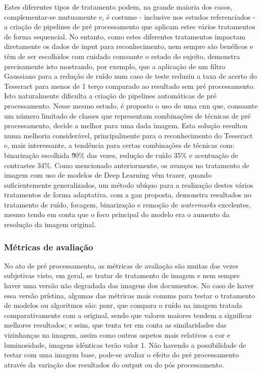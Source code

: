 Estes diferentes tipos de tratamento podem, na grande maioria dos casos, complementar-se mutuamente e, é costume - inclusive nos estudos referenciados - a criação de pipelines de pré processamento que aplicam estes vários tratamentos de forma sequencial. No entanto, como estes diferentes tratamentos impactam diretamente os dados de input para reconhecimento, nem sempre são benéficos e têm de ser escolhidos com cuidado consoante o estado do sujeito.  \cite{8269967} demonstra precisamente isto mostrando, por exemplo, que a aplicação de um filtro Gaussiano para a redução de ruído num caso de teste reduziu a taxa de acerto do Tesseract para menos de 1 terço comparado ao resultado sem pré processamento. 
Isto naturalmente dificulta a criação de pipelines automáticas de pré processamento. Nesse mesmo estudo, é proposto o uso de uma \acrshort{cnn} que, consoante um número limitado de classes que representam combinações de técnicas de pré processamento, decide a melhor para uma dada imagem. Esta solução resultou numa melhoria considerável, principalmente para o reconhecimento do Tesseract e, mais interessante, a tendência para certas combinações de técnicas com: binarização escolhida \~90\% das vezes, redução de ruído 35\% e acentuação de contrastes 34\%.
Como mencionado anteriormente, os avanços no tratamento de imagem com uso de modelos de Deep Learning vêm trazer, quando suficientemente generalizados, um método ubíquo para a realização destes vários tratamentos de forma adaptativa. \cite{9187695} com a \acrshort{gan} proposta, demonstra resultados no tratamento de ruído, focagem, binarização e remoção de \textit{watermarks} excelentes, mesmo tendo em conta que o foco principal do modelo era o aumento da resolução da imagem original. 

\subsubsection{Métricas de avaliação}
No ato de  pré processamento, as métricas de avaliação são muitas das vezes subjetivas visto, em geral, se tratar de tratamento de imagem e nem sempre haver uma versão não degradada das imagens dos documentos. No caso de haver essa versão prístina, algumas das métricas mais comuns para testar o tratamento de modelos ou algoritmos são: \acrshort{psnr}, que compara o ruído na imagem tratada comparativamente com a original, sendo que valores maiores tendem a significar melhores resultados; e \acrshort{ssim}, que tenta ter em conta as similaridades das vizinhanças na imagem, assim como outros aspetos mais relativos a cor e luminosidade, imagens idênticas terão valor 1. Não havendo a possibilidade de testar com uma imagem base, pode-se avaliar o efeito do pré processamento através da variação dos resultados do output ou do pós processamento.


